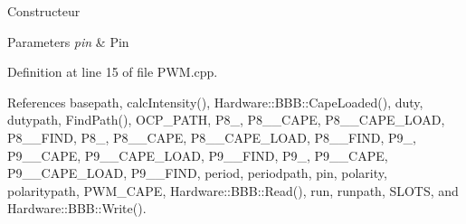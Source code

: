 Constructeur 


\begin{DoxyParams}{Parameters}
{\em pin} & Pin\\
\hline
\end{DoxyParams}


Definition at line 15 of file P\+W\+M.\+cpp.



References basepath, calc\+Intensity(), Hardware\+::\+B\+B\+B\+::\+Cape\+Loaded(), duty, dutypath, Find\+Path(), O\+C\+P\+\_\+\+P\+A\+T\+H, P8\+\_, P8\+\_\+\_\+\+C\+A\+P\+E, P8\+\_\+\_\+\+C\+A\+P\+E\+\_\+\+L\+O\+A\+D, P8\+\_\+\_\+\+F\+I\+N\+D, P8\+\_, P8\+\_\+\_\+\+C\+A\+P\+E, P8\+\_\+\_\+\+C\+A\+P\+E\+\_\+\+L\+O\+A\+D, P8\+\_\+\_\+\+F\+I\+N\+D, P9\+\_, P9\+\_\+\_\+\+C\+A\+P\+E, P9\+\_\+\_\+\+C\+A\+P\+E\+\_\+\+L\+O\+A\+D, P9\+\_\+\_\+\+F\+I\+N\+D, P9\+\_, P9\+\_\+\_\+\+C\+A\+P\+E, P9\+\_\+\_\+\+C\+A\+P\+E\+\_\+\+L\+O\+A\+D, P9\+\_\+\_\+\+F\+I\+N\+D, period, periodpath, pin, polarity, polaritypath, P\+W\+M\+\_\+\+C\+A\+P\+E, Hardware\+::\+B\+B\+B\+::\+Read(), run, runpath, S\+L\+O\+T\+S, and Hardware\+::\+B\+B\+B\+::\+Write().


